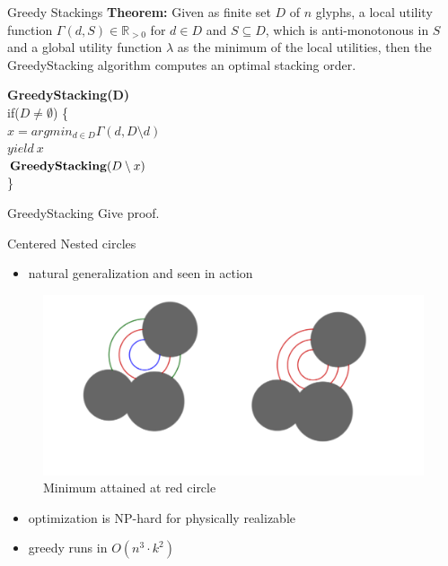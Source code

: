 \documentclass{beamer}
\newcommand\tab[1][1cm]{\hspace*{#1}}
\begin{document}
\begin{frame}{Greedy Stackings}
    \textbf{Theorem:} Given as finite set $D$ of $n$ glyphs, a local utility function $\Gamma(d, S) \in \mathbb{R}_{>0}$ for $d\in D$ and $S\subseteq D$, which is anti-monotonous in $S$ and a global utility function $\lambda$ as the minimum of the local utilities, then the GreedyStacking algorithm computes an optimal stacking order.
    
    \pause
    
    \textbf{GreedyStacking(D)}\\
    if($D\neq \emptyset$) \{\\ 
        \tab$x=argmin_{d\in D} \Gamma(d, D\setminus d)$\\
        \tab$yield\ x$\\
        \tab$\textrm{\textbf{GreedyStacking}}(D\setminus x)$\\
    \}
\end{frame}

\begin{frame}{GreedyStacking}
    Give proof.
\end{frame}

\begin{frame}{Centered Nested circles}
  \begin{itemize}
      \item natural generalization and seen in action
  \end{itemize}
  \begin{figure}[h]
    \centering
      \includegraphics[width=0.9\linewidth]{slides/assets/nested_utility.png}
      \caption{Minimum attained at red circle}
  \end{figure}
  \begin{itemize}
      \item optimization is NP-hard for physically realizable
      \item greedy runs in $O(n^3\cdot k^2)$
  \end{itemize}
\end{frame}
\end{document}
